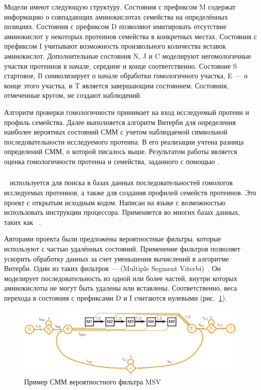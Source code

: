 Модели  имеют следующую структуру.
Состояния с префиксом M содержат информацию о совпадающих аминокислотах 
семейства на определённых позициях.
Состояния с префиксом D позволяют имитировать отсутствие аминокислот у 
некоторых протеинов семейства в конкретных местах.
Состояния с префиксом I учитывают возможность произвольного количества 
вставок аминокислот.
Дополнительные состояния N, J и C моделируют негомологичные участки протеинов в 
начале, середине и конце соответственно.
Состояние S стартовое, B символизирует о начале обработки гомологичного участка, E 
--- о конце этого участка, и T является завершающим состоянием.
Состояния, отмеченные кругом, не создают наблюдений. 

Алгоритм проверки гомологичности принимает на вход 
исследуемый протеин и профиль семейства.
Далее выполняется алгоритм Витерби для определения наиболее 
вероятных состояний СММ с учетом наблюдаемой символьной 
последовательности исследуемого протеина.
В его реализации учтена разница определений СММ, о которой 
писалось выше.
Результатом работы является оценка гомологичности протеина 
и семейства, заданного с помощью .

\subsubsection{}
~\cite{HMMer} используется для поиска в базах данных 
последовательностей гомологов исследуемых протеинов, а также для создания 
профилей семейств протеинов.
Это проект с открытым исходным кодом.
Написан на языке  с возможностью использовать  инструкции 
процессора.
Применяется во многих базах данных, таких как ~\cite{Pfam}.

Авторами проекта были предложены вероятностные фильтры, которые используют 
 с частью удалённых состояний.
Применение фильтров позволяет ускорить обработку данных за счет уменьшения
вычислений в алгоритме Витерби.
Один из таких фильтров ---  (Multiple Segment 
Viterbi)~\cite{MSV_Eddy}.
Он моделирует последовательность из одной или более частей, 
внутри которых аминокислоты не могут быть удалены или 
вставлены.
Соответственно, веса перехода в состояния с префиксами D и I 
считаются нулевыми (рис.~\ref{MSV_example}).
\begin{figure}[t]
  \centering
  \includegraphics[width=\columnwidth]{MSV.png}
  \caption{Пример СММ вероятностного фильтра MSV~\cite{MSV_Eddy}}
  \label{MSV_example}
\end{figure}

